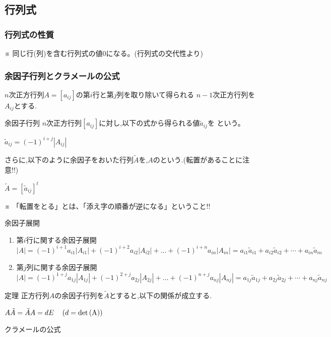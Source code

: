 \documentclass[a4paper]{jsarticle}
\begin{document}
\subsection{行列式}
\subsubsection{行列式の性質}
※ 同じ行(列)を含む行列式の値$0$になる。(行列式の交代性より)
\subsubsection{余因子行列とクラメールの公式}
$n$次正方行列$A=\left[a_{ij}\right]$の第$i$行と第$j$列を取り除いて得られる
$n-1$次正方行列を$A_{ij}$とする.
\begin{itembox}[l]{余因子行列}
    $n$次正方行列$\left[a_{ij}\right]$に対し,以下の式から得られる値$\tilde{a}_{ij}$を
    という。
    \begin{center}
        $\tilde{a}_{ij}=\left(-1\right)^{i+j}\left|A_{ij}\right|$
    \end{center}
    さらに,以下のように余因子をおいた行列$\tilde{A}$を,$A$のという.(転置があることに注意!!)
    \begin{center}
        $\tilde{A}=\left[\tilde{a}_{ij}\right]^t$
    \end{center}
    ※ 「転置をとる」とは、「添え字の順番が逆になる」ということ!!
\end{itembox}
\begin{itembox}[l]{余因子展開}
    \begin{enumerate}[(1)]
        \item 第$i$行に関する余因子展開\\
              $\left|A\right|=(-1)^{i+1}a_{i1}\left|A_{i1}\right|+(-1)^{i+2}a_{i2}\left|A_{i2}\right|+ \dots +(-1)^{i+n}a_{in}\left|A_{in}\right|
                  =a_{i1}\tilde{a}_{i1}+a_{i2}\tilde{a}_{i2}+\cdots +a_{in}\tilde{a}_{in}$
        \item 第$j$列に関する余因子展開\\
              $\left|A\right|=(-1)^{1+j}a_{1j}\left|A_{1j}\right|+(-1)^{2+j}a_{2j}\left|A_{2j}\right|+ \dots +(-1)^{n+j}a_{nj}\left|A_{nj}\right|
                  =a_{1j}\tilde{a}_{1j}+a_{2j}\tilde{a}_{2j}+\cdots +a_{nj}\tilde{a}_{nj}$
    \end{enumerate}
\end{itembox}
\begin{itembox}[l]{定理}
    正方行列$A$の余因子行列を$\tilde{A}$とすると,以下の関係が成立する.
    \begin{center}
        $A\tilde{A}=\tilde{A}A=dE\quad\left(d=\rm{det}\left(A\right)\right)$
    \end{center}
\end{itembox}
\begin{itembox}[l]{クラメールの公式}
\end{itembox}
\end{document}
